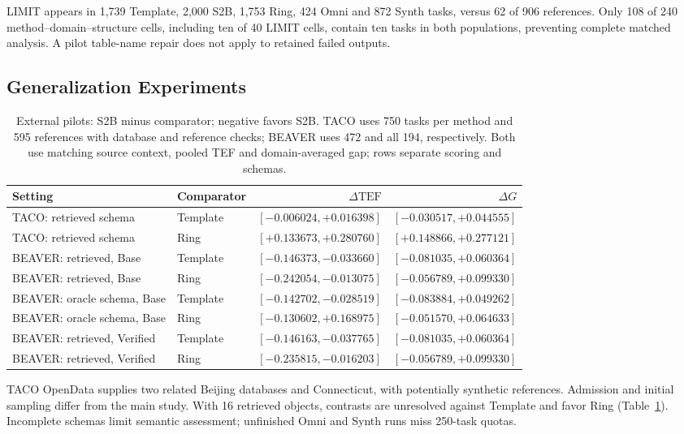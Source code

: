 LIMIT appears in 1,739 Template, 2,000 S2B, 1,753 Ring, 424 Omni and 872 Synth tasks, versus 62 of 906 references. Only 108 of 240 method--domain--structure cells, including ten of 40 LIMIT cells, contain ten tasks in both populations, preventing complete matched analysis. A pilot table-name repair does not apply to retained failed outputs.

\subsection{Generalization Experiments}\label{sec:external}
\begin{table}[t]\centering\small
\caption{External pilots: S2B minus comparator; negative favors S2B. TACO uses 750 tasks per method and 595 references with database and reference checks; BEAVER uses 472 and all 194, respectively. Both use matching source context, pooled TEF and domain-averaged gap; rows separate scoring and schemas.}
\label{tab:external-pilot}
\begin{tabular}{llrr}\toprule
Setting & Comparator & $\Delta\mathrm{TEF}$ & $\Delta G$\\\midrule
TACO: retrieved schema & Template & $[-0.006024,+0.016398]$ & $[-0.030517,+0.044555]$\\
TACO: retrieved schema & Ring & $[+0.133673,+0.280760]$ & $[+0.148866,+0.277121]$\\\midrule
BEAVER: retrieved, Base & Template & $\boldsymbol{[-0.146373,-0.033660]}$ & $[-0.081035,+0.060364]$\\
BEAVER: retrieved, Base & Ring & $\boldsymbol{[-0.242054,-0.013075]}$ & $[-0.056789,+0.099330]$\\
BEAVER: oracle schema, Base & Template & $\boldsymbol{[-0.142702,-0.028519]}$ & $[-0.083884,+0.049262]$\\
BEAVER: oracle schema, Base & Ring & $[-0.130602,+0.168975]$ & $[-0.051570,+0.064633]$\\\midrule
BEAVER: retrieved, Verified & Template & $\boldsymbol{[-0.146163,-0.037765]}$ & $[-0.081035,+0.060364]$\\
BEAVER: retrieved, Verified & Ring & $\boldsymbol{[-0.235815,-0.016203]}$ & $[-0.056789,+0.099330]$\\\bottomrule
\end{tabular}\end{table}

TACO OpenData \citep{deng2026taco} supplies two related Beijing databases and Connecticut, with potentially synthetic references. Admission and initial sampling differ from the main study. With 16 retrieved objects, contrasts are unresolved against Template and favor Ring (Table~\ref{tab:external-pilot}). Incomplete schemas limit semantic assessment; unfinished Omni and Synth runs miss 250-task quotas.


